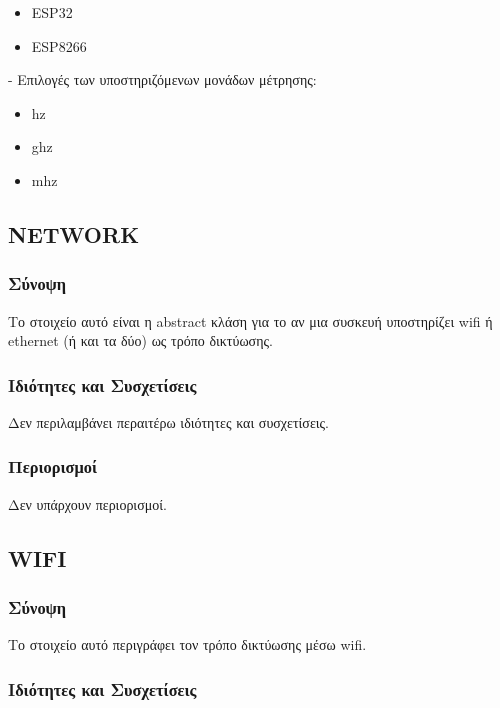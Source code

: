 \begin{itemize}
	\item ESP32
	\item ESP8266
\end{itemize}

\noindent - Επιλογές των υποστηριζόμενων μονάδων μέτρησης:

\begin{itemize}
	\item hz
	\item ghz
	\item mhz
\end{itemize}

\subsection{NETWORK}
\label{subsec:network}

\subsubsection*{Σύνοψη}

\noindent Το στοιχείο αυτό είναι η abstract κλάση για το αν μια συσκευή υποστηρίζει wifi ή ethernet (ή και τα δύο) ως τρόπο δικτύωσης.

\subsubsection*{Ιδιότητες και Συσχετίσεις}

\noindent Δεν περιλαμβάνει περαιτέρω ιδιότητες και συσχετίσεις.

\subsubsection*{Περιορισμοί}

\noindent Δεν υπάρχουν περιορισμοί.

\subsection{WIFI}
\label{subsec:wifi}

\subsubsection*{Σύνοψη}

\noindent Το στοιχείο αυτό περιγράφει τον τρόπο δικτύωσης μέσω wifi.

\subsubsection*{Ιδιότητες και Συσχετίσεις}

